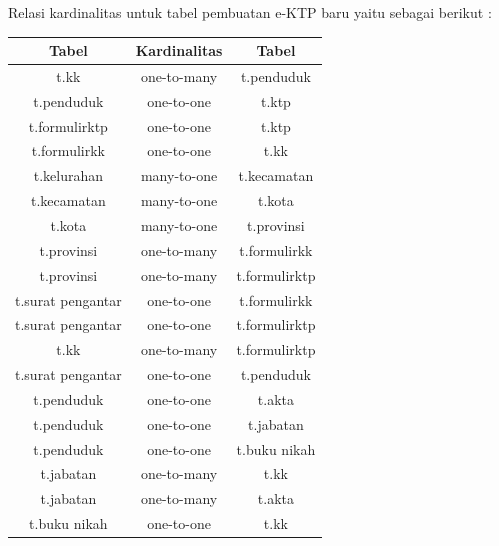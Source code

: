 \begin{table}
\centering
Relasi kardinalitas untuk tabel pembuatan e-KTP baru yaitu sebagai berikut :\\ [3ex]
		\begin{tabular}{|c|c|c|}
			\hline
			\textbf{Tabel}&\textbf{Kardinalitas}&\textbf{Tabel}\\
			\hline
			t.kk  & one-to-many  & t.penduduk  \\
			\hline
			t.penduduk  & one-to-one  & t.ktp  \\
			\hline
			t.formulirktp  & one-to-one  & t.ktp  \\
			\hline
			t.formulirkk  & one-to-one  & t.kk  \\
			\hline
			t.kelurahan  & many-to-one  & t.kecamatan  \\
			\hline
			t.kecamatan  & many-to-one  & t.kota  \\
			\hline
			t.kota  & many-to-one  & t.provinsi  \\
			\hline
			t.provinsi  & one-to-many  & t.formulirkk  \\
			\hline
			t.provinsi  & one-to-many  & t.formulirktp  \\
			\hline
			t.surat pengantar  & one-to-one  & t.formulirkk  \\
			\hline
			t.surat pengantar  & one-to-one  & t.formulirktp  \\
			\hline
			t.kk  & one-to-many  & t.formulirktp  \\
			\hline
			t.surat pengantar  & one-to-one  & t.penduduk  \\
			\hline
			t.penduduk  & one-to-one  & t.akta  \\
			\hline
			t.penduduk  & one-to-one  & t.jabatan  \\
			\hline
			t.penduduk  & one-to-one  & t.buku nikah  \\
			\hline
			t.jabatan  & one-to-many  & t.kk  \\
			\hline
			t.jabatan  & one-to-many  & t.akta  \\
			\hline
			t.buku nikah  & one-to-one  & t.kk  \\
			\hline
		\end{tabular}
\end{table}